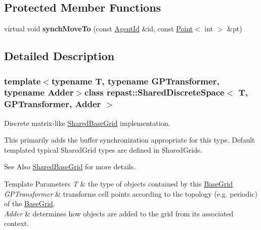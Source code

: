 \subsection*{Protected Member Functions}
\begin{DoxyCompactItemize}
\item 
\hypertarget{classrepast_1_1_shared_discrete_space_a76b6b3583d899b77eb1f78b46c268db2}{virtual void {\bfseries synch\-Move\-To} (const \hyperlink{classrepast_1_1_agent_id}{Agent\-Id} \&id, const \hyperlink{classrepast_1_1_point}{Point}$<$ int $>$ \&pt)}\label{classrepast_1_1_shared_discrete_space_a76b6b3583d899b77eb1f78b46c268db2}

\end{DoxyCompactItemize}


\subsection{Detailed Description}
\subsubsection*{template$<$typename T, typename G\-P\-Transformer, typename Adder$>$class repast\-::\-Shared\-Discrete\-Space$<$ T, G\-P\-Transformer, Adder $>$}

Discrete matrix-\/like \hyperlink{classrepast_1_1_shared_base_grid}{Shared\-Base\-Grid} implementation. 

This primarily adds the buffer synchronization appropriate for this type. Default templated typical Shared\-Grid types are defined in Shared\-Grids.

\begin{DoxySeeAlso}{See Also}
\hyperlink{classrepast_1_1_shared_base_grid}{Shared\-Base\-Grid} for more details.
\end{DoxySeeAlso}

\begin{DoxyTemplParams}{Template Parameters}
{\em T} & the type of objects contained by this \hyperlink{classrepast_1_1_base_grid}{Base\-Grid} \\
\hline
{\em G\-P\-Transformer} & transforms cell points according to the topology (e.\-g. periodic) of the \hyperlink{classrepast_1_1_base_grid}{Base\-Grid}. \\
\hline
{\em Adder} & determines how objects are added to the grid from its associated context. \\
\hline
\end{DoxyTemplParams}


